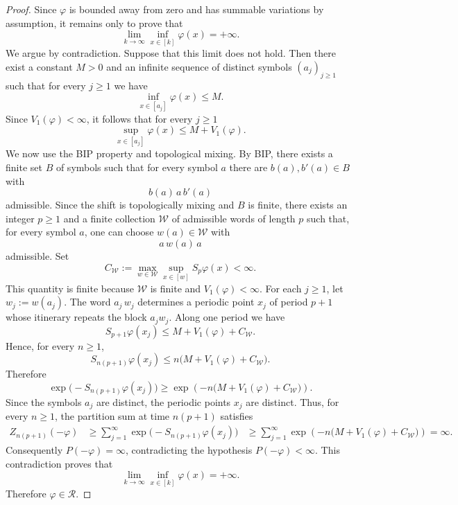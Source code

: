 \documentclass[letterpaper,11pt]{amsart}
\numberwithin{equation}{section}     %
\def\phi{\varphi}
\def\le{\leqslant}
\def\ge{\geqslant}
\begin{document}
\begin{proof}
Since $\phi$ is bounded away from zero and has summable variations by
assumption, it remains only to prove that
\[
        \lim_{k\to\infty}\inf_{x\in[k]}\phi(x)=+\infty .
\]
We argue by contradiction. Suppose that this limit does not hold. Then there
exist a constant $M>0$ and an infinite sequence of distinct symbols
$(a_j)_{j\ge1}$ such that for every $ j\ge1$ we have
\[  \inf_{x\in[a_j]}\phi(x)\le M.  \]
Since $V_1(\phi)<\infty$, it follows that for every $ j\ge1$
\[ \sup_{x\in[a_j]}\phi(x)\le M+V_1(\phi).       \]
We now use the BIP property and topological mixing. By BIP, there exists a
finite set $B$ of symbols such that for every symbol $a$ there are
$b(a),b'(a)\in B$ with
\[
        b(a)\,a\,b'(a)
\]
admissible. Since the shift is topologically mixing and $B$ is finite, there
exists an integer $p\ge1$ and a finite collection $\mathcal W$ of admissible
words of length $p$ such that, for every symbol $a$, one can choose
$w(a)\in\mathcal W$ with
\[
        a\,w(a)\,a
\]
admissible. Set
\[
        C_{\mathcal W}:=
        \max_{w\in\mathcal W}\sup_{x\in[w]} S_p\phi(x)<\infty .
\]
This quantity is finite because $\mathcal W$ is finite and $V_1(\phi)<\infty$. For each $j\ge1$, let $w_j:=w(a_j)$. The word $a_j\,w_j $
determines a periodic point $x_j$ of period $p+1$ whose itinerary repeats the
block $a_jw_j$. Along one period we have
\[
        S_{p+1}\phi(x_j)
        \le
        M+V_1(\phi)+C_{\mathcal W}.
\]
Hence, for every $n\ge1$,
\[
        S_{n(p+1)}\phi(x_j)
        \le
        n\bigl(M+V_1(\phi)+C_{\mathcal W}\bigr).
\]
Therefore
\[
        \exp\bigl(-S_{n(p+1)}\phi(x_j)\bigr)
        \ge
        \exp\left(-n\bigl(M+V_1(\phi)+C_{\mathcal W}\bigr)\right).
\]
Since the symbols $a_j$ are distinct, the periodic points $x_j$ are distinct.
Thus, for every $n\ge1$, the partition sum at time $n(p+1)$ satisfies
\[
\begin{aligned}
        Z_{n(p+1)}(-\phi)
        &\ge
        \sum_{j=1}^\infty
        \exp\bigl(-S_{n(p+1)}\phi(x_j)\bigr)       
        &\ge
        \sum_{j=1}^\infty
        \exp\left(-n\bigl(M+V_1(\phi)+C_{\mathcal W}\bigr)\right)
        =
        \infty .
\end{aligned}
\]
Consequently $P(-\phi)=\infty$, contradicting the hypothesis
$P(-\phi)<\infty$. This contradiction proves that
\[
        \lim_{k\to\infty}\inf_{x\in[k]}\phi(x)=+\infty .
\]
Therefore $\phi\in \mathcal{R}$.
\end{proof}
\end{document}
